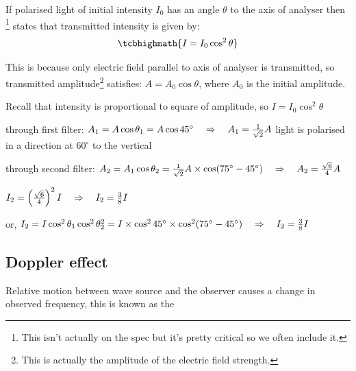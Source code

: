 If polarised light of initial intensity $I_0$ has an angle $\theta$ to the axis of analyser then \footnote{\piste This isn't actually on the spec but it's pretty critical so we often include it.} states that transmitted intensity is given by: $$\tcbhighmath{I = I_0 \cos^2 \theta}$$

This is because only electric field parallel to axis of analyser is transmitted, so transmitted amplitude\footnote{This is actually the amplitude of the electric field strength.} satisfies: $A = A_0 \cos\theta$, where $A_0$ is the initial amplitude.

Recall that intensity is proportional to square of amplitude, so $I = I_0 \cos^2 \theta $


\begin{soln} through first filter: 
$A_1 = A \cos\theta_1 = A \cos 45^\circ \quad \Rightarrow \quad A_1 = \frac{1}{\sqrt{2}} A $
light is polarised in a direction at $60^\circ$ to the vertical

through second filter:
$A_2 = A_1 \cos\theta_2 = \frac{1}{\sqrt{2}} A \times \cos (75^\circ - 45^\circ) \quad \Rightarrow \quad A_2 = \frac{\sqrt{6}}{4} A $

$I_2 = \left(\frac{\sqrt{6}}{4} \right)^2 I \quad \Rightarrow \quad I_2 = \frac{3}{8} I$

 or, $I_2 = I \cos^2\theta_1 \cos^2 \theta_2^2 = I \times \cos^2 45^\circ \times \cos^2 (75^\circ-45^\circ) \quad \Rightarrow \quad I_2 = \frac{3}{8} I$ 

\end{soln}




\subsection{Doppler effect}

\begin{ilight}
	Relative motion between wave source and the observer causes a change in observed frequency, this is known as the 
\end{ilight}

